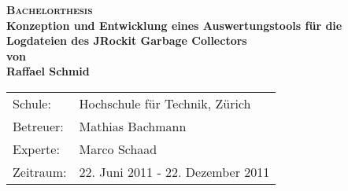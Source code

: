 \begin{titlepage}
\begin{center}
\textsc{\Huge \bf Bachelorthesis}\\[0.4cm]
\LARGE \textbf{Konzeption und Entwicklung eines Auswertungstools für die Logdateien des JRockit Garbage Collectors}\\[1.0cm]
\large \textbf{von}\\[0.5cm]
\large \textbf{Raffael Schmid}\\[4cm]
\vspace{7cm}

\end{center}

\begin{tabular}[ht]{ll}
  Schule: & Hochschule für Technik, Zürich\\
  Betreuer: & Mathias Bachmann\\
  Experte: & Marco Schaad \\
  Zeitraum: & 22. Juni 2011 - 22. Dezember 2011
\end{tabular}
\end{titlepage}
